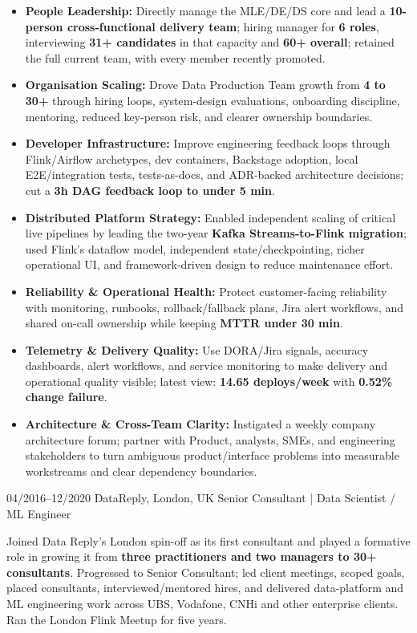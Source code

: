\documentclass[]{../../friggeri-cv}
\begin{document}
\begin{entrylist}
{{        }
        \begin{itemize}[leftmargin=1.1em]
            \item \footnotesize\textbf{People Leadership:} Directly manage the MLE/DE/DS core and lead a \textbf{10-person cross-functional delivery team}; hiring manager for \textbf{6 roles}, interviewing \textbf{31+ candidates} in that capacity and \textbf{60+ overall}; retained the full current team, with every member recently promoted.
            \item \footnotesize\textbf{Organisation Scaling:} Drove Data Production Team growth from \textbf{4 to 30+} through hiring loops, system-design evaluations, onboarding discipline, mentoring, reduced key-person risk, and clearer ownership boundaries.
            \item \footnotesize\textbf{Developer Infrastructure:} Improve engineering feedback loops through Flink/Airflow archetypes, dev containers, Backstage adoption, local E2E/integration tests, tests-as-docs, and ADR-backed architecture decisions; cut a \textbf{3h DAG feedback loop to under 5 min}.
            \item \footnotesize\textbf{Distributed Platform Strategy:} Enabled independent scaling of critical live pipelines by leading the two-year \textbf{Kafka Streams-to-Flink migration}; used Flink's dataflow model, independent state/checkpointing, richer operational UI, and framework-driven design to reduce maintenance effort.
            \item \footnotesize\textbf{Reliability \& Operational Health:} Protect customer-facing reliability with monitoring, runbooks, rollback/fallback plans, Jira alert workflows, and shared on-call ownership while keeping \textbf{MTTR under 30 min}.
            \item \footnotesize\textbf{Telemetry \& Delivery Quality:} Use DORA/Jira signals, accuracy dashboards, alert workflows, and service monitoring to make delivery and operational quality visible; latest view: \textbf{14.65 deploys/week} with \textbf{0.52\% change failure}.
            \item \footnotesize\textbf{Architecture \& Cross-Team Clarity:} Instigated a weekly company architecture forum; partner with Product, analysts, SMEs, and engineering stakeholders to turn ambiguous product/interface problems into measurable workstreams and clear dependency boundaries.
        \end{itemize}
    }
    \entry
    {04/2016--12/2020}
    {DataReply, London, UK}
    {Senior Consultant | Data Scientist / ML Engineer}
    {
        {\small
        \setlength{\parindent}{0pt}
        \setlength{\leftskip}{0pt}
        Joined Data Reply's London spin-off as its first consultant and played a formative role in growing it from \textbf{three practitioners and two managers to 30+ consultants}. Progressed to Senior Consultant; led client meetings, scoped goals, placed consultants, interviewed/mentored hires, and delivered data-platform and ML engineering work across UBS, Vodafone, CNHi and other enterprise clients. Ran the London Flink Meetup for five years.

}}
\end{entrylist}
\end{document}

